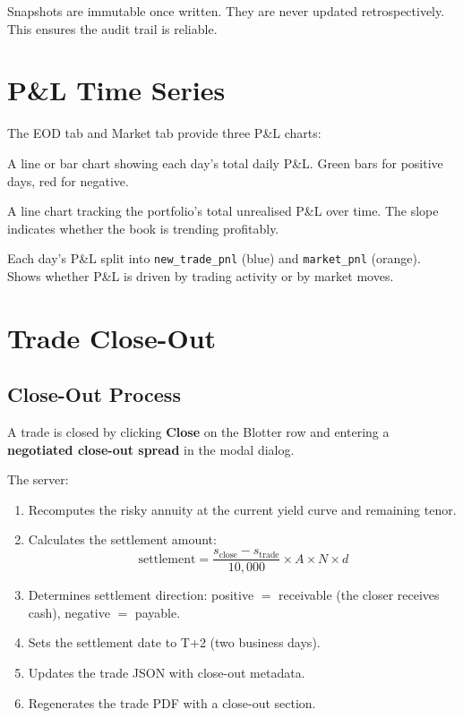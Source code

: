 \documentclass[11pt,a4paper]{article}
\begin{document}
\noindent Snapshots are immutable once written.  They are never updated
retrospectively.  This ensures the audit trail is reliable.


\section{P\&L Time Series}

The EOD tab and Market tab provide three P\&L charts:

\begin{description}[leftmargin=2em]
  \item[Daily P\&L] A line or bar chart showing each day's total
        daily P\&L.  Green bars for positive days, red for negative.
  \item[Cumulative Running P\&L] A line chart tracking the portfolio's
        total unrealised P\&L over time.  The slope indicates whether
        the book is trending profitably.
  \item[Attribution Stacked Bars] Each day's P\&L split into
        \texttt{new\_trade\_pnl} (blue) and \texttt{market\_pnl}
        (orange).  Shows whether P\&L is driven by trading activity
        or by market moves.
\end{description}


\section{Trade Close-Out}

\subsection{Close-Out Process}

A trade is closed by clicking \textbf{Close} on the Blotter row and
entering a \textbf{negotiated close-out spread} in the modal dialog.

The server:
\begin{enumerate}
  \item Recomputes the risky annuity at the current yield curve and
        remaining tenor.
  \item Calculates the settlement amount:
        \[
          \text{settlement} = \frac{s_{\text{close}} - s_{\text{trade}}}{10{,}000}
              \times A \times N \times d
        \]
  \item Determines settlement direction: positive $=$ receivable
        (the closer receives cash), negative $=$ payable.
  \item Sets the settlement date to T$+$2 (two business days).
  \item Updates the trade JSON with close-out metadata.
  \item Regenerates the trade PDF with a close-out section.
\end{enumerate}
\end{document}
